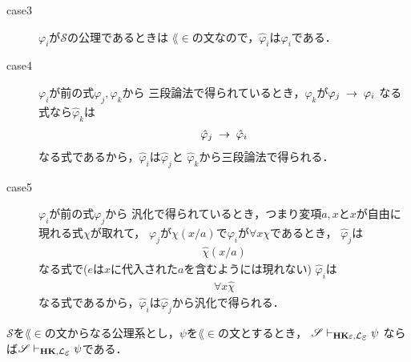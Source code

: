 \begin{metaprf}
\begin{description}
			\item[case3] $\varphi_{i}$が$\mathscr{S}$の公理であるときは
				$\lang{\in}$の文なので，$\hat{\varphi}_{i}$は$\varphi_{i}$である．
				
			\item[case4] $\varphi_{i}$が前の式$\varphi_{j},\varphi_{k}$から
				三段論法で得られているとき，$\varphi_{k}$が$\varphi_{j} \hspace{0.25em}\rightarrow\hspace{0.25em} \varphi_{i}$
				なる式なら$\hat{\varphi}_{k}$は
				\begin{align}
					\hat{\varphi}_{j} \hspace{0.25em}\rightarrow\hspace{0.25em} \hat{\varphi}_{i}
				\end{align}
				なる式であるから，$\hat{\varphi}_{i}$は$\hat{\varphi}_{j}$と
				$\hat{\varphi}_{k}$から三段論法で得られる．
				
			\item[case5] $\varphi_{i}$が前の式$\varphi_{j}$から
				汎化で得られているとき，つまり変項$a,x$と$x$が自由に現れる式$\chi$が取れて，
				$\varphi_{j}$が$\chi(x/a)$で$\varphi_{i}$が$\forall x \chi$であるとき，
				$\hat{\varphi}_{j}$は
				\begin{align}
					\hat{\chi}(x/a)
				\end{align}
				なる式で($e$は$x$に代入された$a$を含むようには現れない)
				$\hat{\varphi}_{i}$は
				\begin{align}
					\forall x \hat{\chi}
				\end{align}
				なる式であるから，$\hat{\varphi}_{i}$は$\hat{\varphi}_{j}$から汎化で得られる．
				\QED
		\end{description}
	\end{metaprf}
	
	\begin{screen}
		\begin{metathm}
		\label{metathm:Henkin_expansion_2}
			$\mathscr{S}$を$\lang{\in}$の文からなる公理系とし，$\psi$を$\lang{\in}$の文とするとき，
			$\mathscr{S} \provable{\mbox{{\bf HK}$\varepsilon$},\lang{\varepsilon}} \psi$
			ならば$\mathscr{S} \provable{\mbox{{\bf HK}},\lang{\varepsilon}} \psi$である．
		\end{metathm}
	\end{screen}
	
